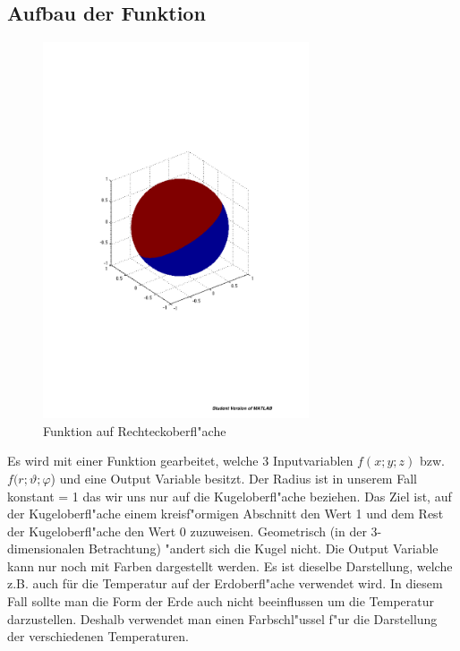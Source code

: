 \begin{refsection}
 
\section{Aufbau der Funktion}

\begin{figure}%
\centering
\includegraphics[width=0.7\textwidth]{kugel/Funktion.pdf}
\caption{Funktion auf Rechteckoberfl"ache
\label{skript:Funktion auf Rechteckoberflaeche}}
\end{figure}

Es wird mit einer Funktion gearbeitet, welche 3 Inputvariablen $f(x;y;z)$ bzw. $f(r;\vartheta;\varphi$) und eine Output Variable besitzt. Der Radius ist in unserem Fall konstant = 1 das wir uns nur auf die Kugeloberfl"ache beziehen. Das Ziel ist, auf der Kugeloberfl"ache einem kreisf"ormigen Abschnitt den Wert 1 und dem Rest der Kugeloberfl"ache den Wert 0 zuzuweisen. Geometrisch (in der 3-dimensionalen Betrachtung) "andert sich die Kugel nicht. Die Output Variable kann nur noch mit Farben dargestellt werden. Es ist dieselbe Darstellung, welche z.B. auch für die Temperatur auf der Erdoberfl"ache verwendet wird. In diesem Fall sollte man die Form der Erde auch nicht beeinflussen um die Temperatur darzustellen. Deshalb verwendet man einen Farbschl"ussel f"ur die Darstellung der verschiedenen Temperaturen.\\


\end{refsection}
